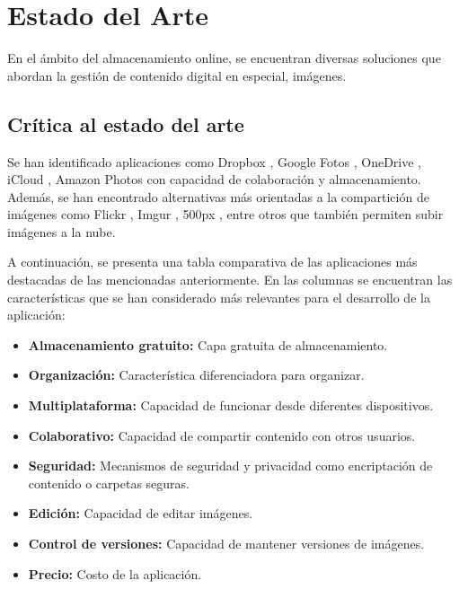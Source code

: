 \chapter{Estado del Arte}

En el ámbito del almacenamiento online, se encuentran diversas soluciones
que abordan la gestión de contenido digital en especial, imágenes.

\section{Crítica al estado del arte}

Se han identificado aplicaciones como Dropbox \cite{dropbox}, Google Fotos \cite{googlefotos}, OneDrive \cite{onedrive}, iCloud \cite{icloud}, Amazon Photos \cite{amazonphotos} con capacidad de colaboración y almacenamiento.
Además, se han encontrado alternativas más orientadas a la compartición de imágenes como Flickr \cite{flickr}, Imgur \cite{imgur}, 500px \cite{500px}, entre otros que también permiten subir imágenes a la nube.

A continuación, se presenta una tabla comparativa de las aplicaciones más destacadas de las mencionadas anteriormente. En las columnas se encuentran las características que se han considerado más relevantes para el desarrollo de la aplicación:

\begin{itemize}
    \item \textbf{Almacenamiento gratuito:} Capa gratuita de almacenamiento.
    \item \textbf{Organización:} Característica diferenciadora para organizar.
    \item \textbf{Multiplataforma:} Capacidad de funcionar desde diferentes dispositivos.
    \item \textbf{Colaborativo:} Capacidad de compartir contenido con otros usuarios.
    \item \textbf{Seguridad:} Mecanismos de seguridad y privacidad como encriptación de contenido o carpetas seguras.
    \item \textbf{Edición:} Capacidad de editar imágenes.
    \item \textbf{Control de versiones:} Capacidad de mantener versiones de imágenes.
    \item \textbf{Precio:} Costo de la aplicación.
\end{itemize}

